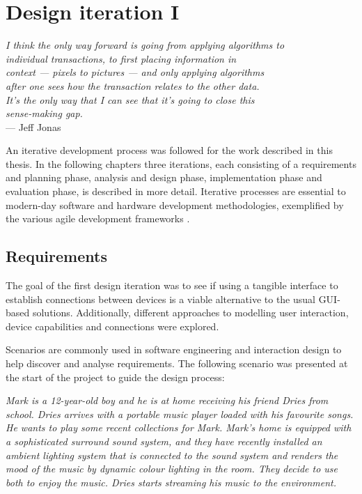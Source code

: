 \chapter{Design iteration I}
\label{DesignIteration1}

\begin{flushright}{\slshape    
I think the only way forward is going from applying algorithms to\\
individual transactions, to first placing information in \\
context --- pixels to pictures --- and only applying algorithms \\
after one sees how the transaction relates to the other data.\\
It's the only way that I can see that it's going to close this\\
 sense-making gap.} \\ \medskip
    --- Jeff Jonas \cite{AlexWoodie}
\end{flushright}



An iterative development process was followed for the work described in this thesis. In the following chapters three iterations, each consisting of a requirements and planning phase, analysis and design phase, implementation phase and evaluation phase, is described in more detail. Iterative processes are essential to modern-day software and hardware development methodologies, exemplified by the various agile development frameworks \cite{Larman2003}.

\section{Requirements}

The goal of the first design iteration was to see if using a tangible interface to establish connections between devices is a viable alternative to the usual \ac{GUI}-based solutions. Additionally, different approaches to modelling user interaction, device capabilities and connections were explored.

Scenarios are commonly used in software engineering and interaction design to help discover and analyse requirements. The following scenario was presented at the start of the project to guide the design process:

\emph{Mark is a 12-year-old boy and he is at home receiving his friend Dries from school. Dries arrives with a portable music player loaded with his favourite songs. He wants to play some recent collections for Mark. Mark's home is equipped with a sophisticated surround sound system, and they have recently installed an ambient lighting system that is connected to the sound system and renders the mood of the music by dynamic colour lighting in the room. They decide to use both to enjoy the music. Dries starts streaming his music to the environment.}

